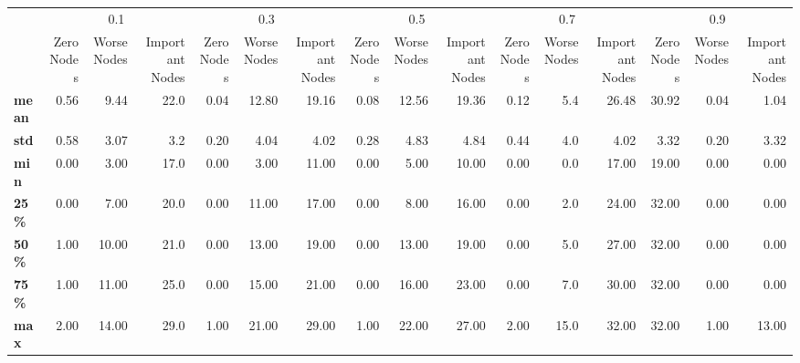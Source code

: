 \begin{tabular}{lrrrrrrrrrrrrrrr}
\toprule
{} & \multicolumn{3}{c}{0.1} & \multicolumn{3}{c}{0.3} & \multicolumn{3}{c}{0.5} & \multicolumn{3}{c}{0.7} & \multicolumn{3}{c}{0.9} \\
{} & Zero Nodes & Worse Nodes & Important Nodes & Zero Nodes & Worse Nodes & Important Nodes & Zero Nodes & Worse Nodes & Important Nodes & Zero Nodes & Worse Nodes & Important Nodes & Zero Nodes & Worse Nodes & Important Nodes \\
\midrule
\textbf{mean} &       0.56 &        9.44 &            22.0 &       0.04 &       12.80 &           19.16 &       0.08 &       12.56 &           19.36 &       0.12 &         5.4 &           26.48 &      30.92 &        0.04 &            1.04 \\
\textbf{std } &       0.58 &        3.07 &             3.2 &       0.20 &        4.04 &            4.02 &       0.28 &        4.83 &            4.84 &       0.44 &         4.0 &            4.02 &       3.32 &        0.20 &            3.32 \\
\textbf{min } &       0.00 &        3.00 &            17.0 &       0.00 &        3.00 &           11.00 &       0.00 &        5.00 &           10.00 &       0.00 &         0.0 &           17.00 &      19.00 &        0.00 &            0.00 \\
\textbf{25\% } &       0.00 &        7.00 &            20.0 &       0.00 &       11.00 &           17.00 &       0.00 &        8.00 &           16.00 &       0.00 &         2.0 &           24.00 &      32.00 &        0.00 &            0.00 \\
\textbf{50\% } &       1.00 &       10.00 &            21.0 &       0.00 &       13.00 &           19.00 &       0.00 &       13.00 &           19.00 &       0.00 &         5.0 &           27.00 &      32.00 &        0.00 &            0.00 \\
\textbf{75\% } &       1.00 &       11.00 &            25.0 &       0.00 &       15.00 &           21.00 &       0.00 &       16.00 &           23.00 &       0.00 &         7.0 &           30.00 &      32.00 &        0.00 &            0.00 \\
\textbf{max } &       2.00 &       14.00 &            29.0 &       1.00 &       21.00 &           29.00 &       1.00 &       22.00 &           27.00 &       2.00 &        15.0 &           32.00 &      32.00 &        1.00 &           13.00 \\
\bottomrule
\end{tabular}
